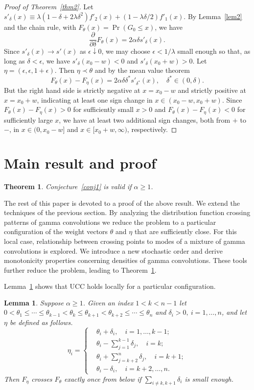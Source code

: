 \documentclass[11pt]{article}
\newtheorem{theorem}{\bf Theorem}
\newtheorem{lemma}{\bf Lemma}
\begin{document}
\begin{proof}[Proof of Theorem~\ref{thm2}]
Let $s'_\delta(x) \equiv \lambda (1 -\delta +2\lambda\delta^2) f'_2(x) + (1-\lambda\delta/2) f'_1(x)$.  By Lemma~\ref{lem2} and the chain rule, with $F_\theta(x) =\Pr(G_0\leq x)$, we have 
$$\frac{\partial}{\partial \delta}F_\theta(x) = 2\alpha\delta s'_\delta(x).$$
Since $s'_\delta(x) \to s'(x)$ as $\epsilon\downarrow 0$, we may choose $\epsilon<1/\lambda$ small enough so that, as long as $\delta <\epsilon$, we have $s'_\delta(x_0-w)<0$ and $s'_\delta(x_0+w)>0$.  Let $\eta = (\epsilon, \epsilon, 1+\epsilon)$.  Then $\eta\prec \theta$ and by the mean value theorem 
$$F_\theta(x) - F_\eta(x) = 2\alpha 
\delta\delta^*s'_{\delta^*}(x),\quad \delta^*\in (0, \delta).$$
But the right hand side is strictly negative at $x = x_0-w$ and strictly positive at $x = x_0+w$, indicating at least one sign change in $x\in (x_0 - w, x_0 + w)$.  Since $F_\theta(x) - F_\eta(x)>0$ for sufficiently small $x>0$ and $F_\theta(x) - F_\eta(x)<0$ for sufficiently large $x$, we have at least two additional sign changes, both from $+$ to $-$, in $x\in (0, x_0 - w]$ and $x\in [x_0+w, \infty)$, respectively.  
\end{proof}

\section{Main result and proof}
\begin{theorem}
\label{main.thm}
Conjecture~\ref{conj1} is valid if $\alpha \geq 1$. 
\end{theorem}
The rest of this paper is devoted to a proof of the above result.  We extend the techniques of the previous section.  By analyzing the distribution function crossing patterns of gamma convolutions we reduce the problem to a particular configuration of the weight vectors $\theta$ and $\eta$ that are sufficiently close.  For this local case, relationship between crossing points to modes of a mixture of gamma convolutions is explored.  We introduce a new stochastic order and derive monotonicity properties concerning densities of gamma convolutions.  These tools further reduce the problem, leading to Theorem~\ref{main.thm}.  

Lemma~\ref{lem.loc} shows that UCC holds locally for a particular configuration.  \begin{lemma}
\label{lem.loc}
Suppose $\alpha\geq 1$.  Given an index $1<k<n-1$ let $0<\theta_1\leq \cdots \leq \theta_{k-1}<\theta_k\leq \theta_{k+1}< \theta_{k+2}\leq\cdots \leq \theta_n$ and $\delta_i>0,\ i=1,\ldots, n$, and let $\eta$ be defined as follows.
$$
\eta_i = \begin{cases} &\theta_i + \delta_i,\quad i=1,\ldots, k-1;\\
 & \theta_i - \sum_{j=1}^{k-1} \delta_j, \quad i=k;\\
 & \theta_i + \sum_{j=k+2}^n \delta_j, \quad i=k+1;\\
 & \theta_i -\delta_i,\quad i=k+2,\ldots, n.
\end{cases}
$$
Then $F_\eta$ crosses $F_\theta$ exactly once from below if $\sum_{i\neq k, k+1} \delta_i $ is small enough. 
\end{lemma}
\end{document}
